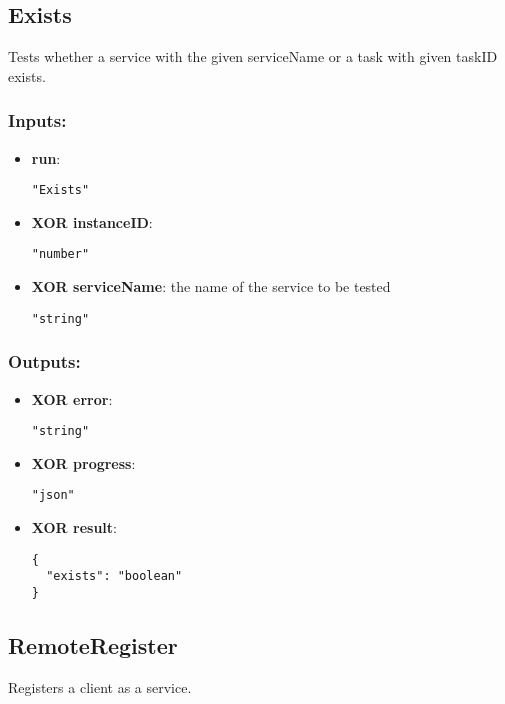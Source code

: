 \subsection{Exists}
Tests whether a service with the given serviceName or a task with given taskID exists.
\subsubsection*{Inputs:}
\begin{itemize}
    \item \textbf{run}: 
\begin{lstlisting}
"Exists"
\end{lstlisting}
    \item \textbf{XOR instanceID}: 
\begin{lstlisting}
"number"
\end{lstlisting}
    \item \textbf{XOR serviceName}: the name of the service to be tested
\begin{lstlisting}
"string"
\end{lstlisting}
  \end{itemize}

\subsubsection*{Outputs:}
\begin{itemize}
    \item \textbf{XOR error}: 
\begin{lstlisting}
"string"
\end{lstlisting}
    \item \textbf{XOR progress}: 
\begin{lstlisting}
"json"
\end{lstlisting}
    \item \textbf{XOR result}: 
\begin{lstlisting}
{
  "exists": "boolean"
}
\end{lstlisting}
  \end{itemize}

\subsection{RemoteRegister}
Registers a client as a service.
